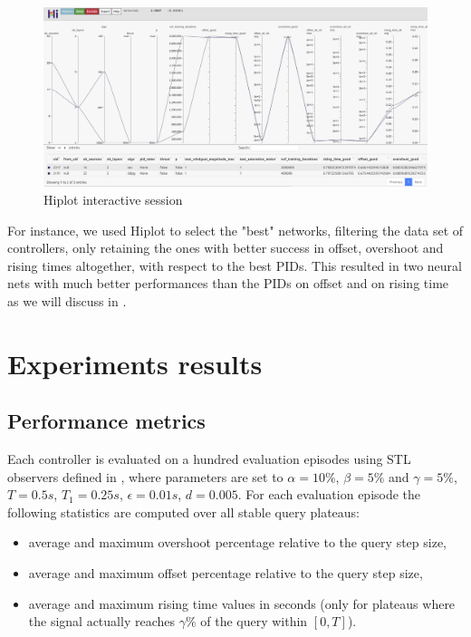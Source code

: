 \documentclass[anonymous=true,format=sigconf, screen=true, review=false]{acmart}
\begin{document}
\begin{figure}
\includegraphics[width=\linewidth]{hiplot_better_networks}
\caption{Hiplot interactive session}%
\label{fig:hiplot}
\end{figure}
For instance, we used Hiplot to select the "best" networks,  filtering the data set of controllers, only retaining the ones with better success in offset, overshoot and rising times altogether, with respect to the best PIDs.
This resulted in two neural nets with much better performances than the PIDs on offset and on rising time as we will discuss in .

\section{Experiments results}
\label{sec:exp-results}
\subsection{Performance metrics}

Each controller is evaluated on a hundred evaluation episodes using STL observers defined in ,
where parameters are set to $\alpha=10\%$, $\beta=5\%$ and $\gamma=5\%$, $T=0.5s$, $T_1=0.25s$, $\epsilon = 0.01s$, $d=0.005$.
For each evaluation episode the following statistics are computed over all stable query plateaus: 
\begin{itemize}
\item average and maximum overshoot percentage relative to the query step size, 
\item average and maximum offset percentage relative to the query step size, 
\item average and maximum rising time values in seconds (only for plateaus where the signal actually reaches $\gamma\%$ of the query within $[0,T]$).
\end{itemize}
\end{document}

